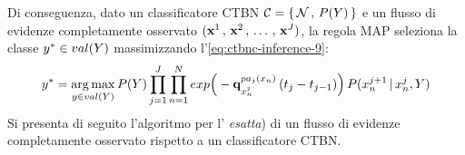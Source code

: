 Di conseguenza, dato un classificatore \acs{CTBN} $\mathcal{C}=\{\,\mathcal{N}\,,\,P(\mathnormal{Y})\,\}$ e un flusso di evidenze completamente osservato $(\mathbf{x}^1\,,\,\mathbf{x}^2\,,\,\dotsc\,,\,\mathbf{x}^{J})$, la regola \acs{MAP} seleziona la classe $\mathnormal{y}^* \in val(\mathnormal{Y})$ massimizzando l'\autoref{eq:ctbnc-inference-9}:
\begin{equation}\label{eq:ctbnc-inference-10}
\mathnormal{y}^*= \operatorname*{arg\,max}_{\mathnormal{y}\in val(\mathnormal{Y})}P(\mathnormal{Y})\prod_{j=1}^{J}\prod_{n=1}^N exp\Big(-\boldsymbol{\textbf{\text{q}}}_{\mathnormal{x}_n^j}^{pa_j(\mathnormal{x}_n)}\,(t_j - t_{j-1})\Big)\,P(\mathnormal{x}_n^{j+1}\,\arrowvert\,\mathnormal{x}_n^j,\mathnormal{Y})
\end{equation}
Si presenta di seguito l'algoritmo per l'\emph{ esatta}) di un flusso di evidenze completamente osservato rispetto a un classificatore \acs{CTBN}.

